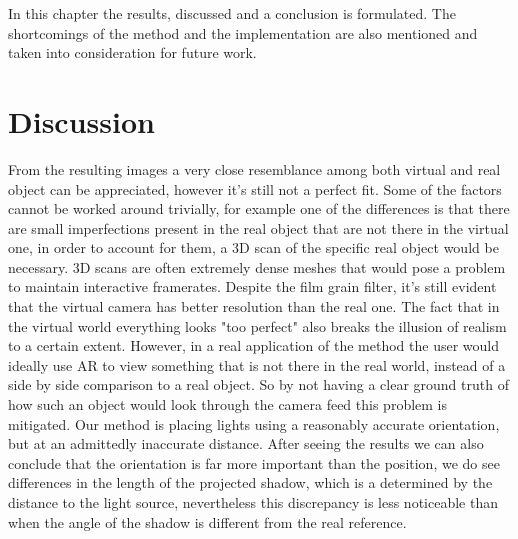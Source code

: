 In this chapter the results, discussed and a conclusion is formulated. The shortcomings of the method and the implementation are also mentioned and taken into consideration for future work.

\section{Discussion}
From the resulting images a very close resemblance among both virtual and real object can be appreciated, however it's still not a perfect fit. Some of the factors cannot be worked around trivially, for example one of the differences is that there are small imperfections present in the real object that are not there in the virtual one, in order to account for them, a 3D scan of the specific real object would be necessary. 3D scans are often extremely dense meshes that would pose a problem to maintain interactive framerates.\newline
Despite the film grain filter, it's still evident that the virtual camera has better resolution than the real one. The fact that in the virtual world everything looks "too perfect" also breaks the illusion of realism to a certain extent. However, in a real application of the method the user would ideally use AR to view something that is not there in the real world, instead of a side by side comparison to a real object. So by not having a clear ground truth of how such an object would look through the camera feed this problem is mitigated.\newline
Our method is placing lights using a reasonably accurate orientation, but at an admittedly inaccurate distance. After seeing the results we can also conclude that the orientation is far more important than the position, we do see differences in the length of the projected shadow, which is a determined by the distance to the light source, nevertheless this discrepancy is less noticeable than when the angle of the shadow is different from the real reference.

